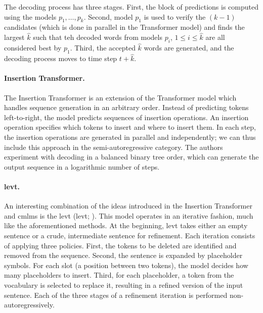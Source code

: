The decoding process has three stages. First, the block of predictions is
computed using the models $p_1, \ldots, p_k$. Second, model $p_1$ is used to
verify the $(k-1)$ candidates (which is done in parallel in the Transformer
model) and finds the largest $\hat{k}$ such that teh decoded words from models
$p_i$, $1 \leq i \leq \hat{k}$ are all considered best by $p_1$. Third, the
accepted $\hat{k}$ words are generated, and the decoding process moves to time
step $t + \hat{k}$.

\paragraph{Insertion Transformer.} The Insertion Transformer
\citep{stern-etal-2019-insertion} is an extension of the Transformer model
which handles sequence generation in an arbitrary order. Instead of predicting
tokens left-to-right, the model predicts sequences of insertion operations. An
insertion operation specifies which tokens to insert and where to insert
them. In each step, the insertion operations are generated in parallel and
independently; we can thus include this approach in the semi-autoregressive
category. The authors experiment with decoding in a balanced binary tree order,
which can generate the output sequence in a logarithmic number of steps.


\paragraph{\acl{levt}.} An interesting combination of the ideas introduced in
the Insertion Transformer and \acp{cmlm} is the \acl{levt}
(\acs{levt}; \citealp{gu-etal-2019-levenshtein}). This model
operates in an iterative fashion, much like the aforementioned methods. At the
beginning, \ac{levt} takes either an empty sentence or a crude, intermediate
sentence for refinement. Each iteration consists of applying three
policies. First, the tokens to be deleted are identified and removed from the
sequence. Second, the sentence is expanded by placeholder symbols. For each
slot (a position between two tokens), the model decides how many placeholders
to insert. Third, for each placeholder, a token from the vocabulary is selected
to replace it, resulting in a refined version of the input sentence.  Each of
the three stages of a refinement iteration is performed non-autoregressively.

